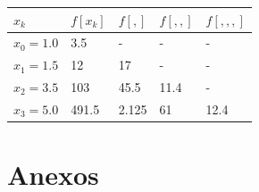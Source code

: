 \documentclass[english,notitlepage,letterpaper, 10pt]{article} %
\begin{document}
\begin{enumerate}
\begin{enumerate}
\begin{center}
\begin{table}[H]
\begin{tabular}{|p{1.5cm}|p{1.5cm}|p{1.5cm}|p{1.5cm}|p{1.5cm}|}
           \hline  
           $x_k$ & $f[x_k]$ & $f[,]$ & $f[,,]$ & $f[,,,]$    \\ \hline
          $x_0 = 1.0$ & 3.5   & -      & -       & -         \\ \hline
          $x_1 = 1.5$ & 12    & 17     & -       & -         \\ \hline
          $x_2 = 3.5$ & 103   & 45.5   & 11.4    & -         \\ \hline
          $x_3 = 5.0$ & 491.5 & 2.125  & 61      & 12.4      \\ \hline
    
          \end{tabular}
        \end{table}
      \end{center}


    \end{enumerate}

\end{enumerate}

\newpage

\section{Anexos}
\end{document}
